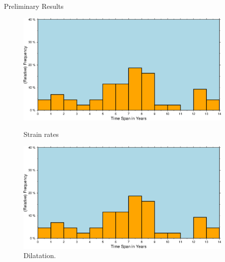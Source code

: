 \documentclass[final,a0,portrait]{beamer}
\newlength{\sepwid}
\newlength{\onecolwid}
\begin{document}
\begin{frame}[t]
\begin{columns}[t]
\begin{column}{\onecolwid}
\begin{block}{Preliminary Results}
{\begin{figure}
\centering
\begin{minipage}{.5\textwidth}
    \centering
    \includegraphics[width=1\linewidth]{sample}
    \caption{Strain rates} %
    \label{fig:strain}
\end{minipage}%
\begin{minipage}{.5\textwidth}
    \centering
    \includegraphics[width=1\linewidth]{sample}
    \caption{Dilatation.}
    \label{fig:dil}
\end{minipage}
\end{figure}


}
\end{block}


\end{column} %

\begin{column}{\sepwid}\end{column} %


\end{columns}
\end{frame}
\end{document}
